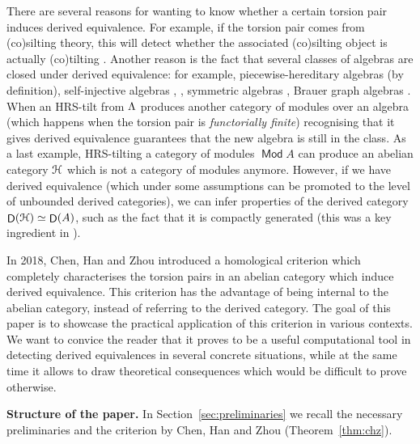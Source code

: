 \documentclass[a4paper,11pt]{amsart}
\theoremstyle{plain}
\theoremstyle{definition}
\DeclareMathOperator{\D}{\mathsf{D}}
\DeclareMathOperator{\Mod}{\mathsf{Mod}}
\let\mod\relax
\DeclareMathOperator{\mod}{\mathsf{mod}}
\begin{document}
There are several reasons for wanting to know whether a certain torsion pair
induces derived equivalence. For example, if the torsion pair comes from
(co)silting theory, this will detect whether the associated (co)silting object is
actually (co)tilting \cite[Prop.~5.1]{psar-vito-18}.
Another reason is the fact that several classes of algebras are closed under
derived equivalence: for example, piecewise-hereditary algebras (by definition),
self-injective algebras \cite[Thm.~A.5]{aiha-13}, \cite[Thm.~2.1]{alno-rick-13},
symmetric algebras \cite[Cor.~5.3]{rick-91}, Brauer graph algebras
\cite{anti-zvon-22}. When an HRS-tilt from $\mod\Lambda$ produces another category of modules over
an algebra (which happens when the torsion pair is \emph{functorially finite})
recognising that it gives derived equivalence guarantees that the new algebra is
still in the class. As a last example, HRS-tilting a category of modules $\Mod
A$ can produce an abelian category $\mathcal{H}$ which is not a category of modules
anymore. However, if we have derived equivalence (which under some assumptions
can be promoted to the level of unbounded derived categories), we can infer
properties of the derived category $\D(\Hcal)\simeq\D(A)$, such as the fact that
it is compactly generated (this was a key ingredient in
\cite[\S3.3]{hrbe-pavo-23}).

In 2018, Chen, Han and Zhou \cite{chen-han-zhou-19} introduced a homological
criterion which completely characterises the torsion pairs in an abelian
category which induce derived equivalence. This criterion has the advantage of
being internal to the abelian category, instead of referring to the derived
category. The goal of this paper is to showcase the practical application of
this criterion in various contexts. We want to convice the reader that it proves
to be a useful computational tool in detecting derived equivalences in
several concrete situations, while at the same time it allows to draw
theoretical consequences which would be difficult to prove otherwise.

\medskip

\textbf{Structure of the paper.} In Section~\ref{sec:preliminaries} we recall the necessary
preliminaries and the criterion by Chen, Han and Zhou (Theorem~\ref{thm:chz}).
\end{document}
